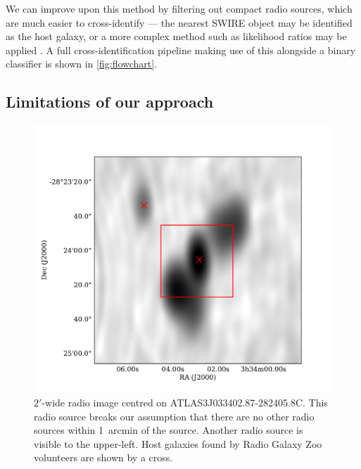 \documentclass[fleqn,usenatbib,usedcolumn]{mnras}
\begin{document}
    We can improve upon this method by filtering out compact radio sources,
    which are much easier to cross-identify --- the nearest SWIRE object may
    be identified as the host galaxy, or a more complex method such as
    likelihood ratios may be applied \citep[see][]{weston17}. A full
    cross-identification pipeline making use of this alongside a binary
    classifier is shown in \autoref{fig:flowchart}.

  \subsection{Limitations of our approach}
    \label{sec:limitations}

     \begin{figure}
      \centering
      \includegraphics[width=\linewidth]{images/CI0077C1_fig.pdf}
      \caption{$2'$-wide radio image centred on ATLAS3\textunderscore{}J033402.87-282405.8C.
        This radio source breaks our assumption that there are no other radio
        sources within 1~arcmin of the source. Another radio source is visible
        to the upper-left. Host galaxies found by Radio Galaxy Zoo volunteers
        are shown by a cross.}
      \label{fig:broken-isolation}
    \end{figure}
\end{document}
